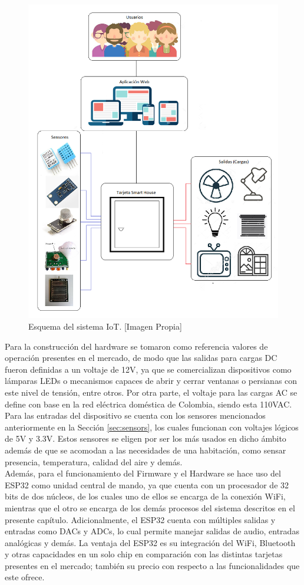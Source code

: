 \begin{figure}[H]
	\centering
	\caption[Esquema del sistema IoT.]{Esquema del sistema IoT. [Imagen Propia]}
	\label{fig:diagramas}
	\includegraphics[width=0.7\linewidth]{Imagenes/Diagramas}
\end{figure}

Para la construcción del hardware se tomaron como referencia valores de operación presentes en el mercado, de modo que las salidas para cargas DC fueron definidas a un voltaje de 12V, ya que se comercializan dispositivos como lámparas LEDs o mecanismos capaces de abrir y cerrar ventanas o persianas con este nivel de tensión, entre otros. Por otra parte, el voltaje para las cargas AC se define con base en la red eléctrica doméstica de Colombia, siendo esta 110VAC. Para las entradas del dispositivo se cuenta con los sensores mencionados anteriormente en la Sección \ref{sec:sensors}, los cuales funcionan con voltajes lógicos de 5V y 3.3V. Estos sensores se eligen por ser los más usados en dicho ámbito además de que se acomodan a las necesidades de una habitación, como sensar presencia, temperatura, calidad del aire y demás.\\

Además, para el funcionamiento del Firmware y el Hardware se hace uso del ESP32 como unidad central de mando, ya que cuenta con un procesador de 32 bits de dos núcleos, de los cuales uno de ellos se encarga de la conexión WiFi, mientras que el otro se encarga de los demás procesos del sistema descritos en el presente capítulo. Adicionalmente, el ESP32 cuenta con múltiples salidas y entradas como DACs y ADCs, lo cual permite manejar salidas de audio, entradas analógicas y demás. La ventaja del ESP32 es su integración del WiFi, Bluetooth y otras capacidades en un solo chip en comparación con las distintas tarjetas presentes en el mercado; también su precio con respecto a las funcionalidades que este ofrece.\\


